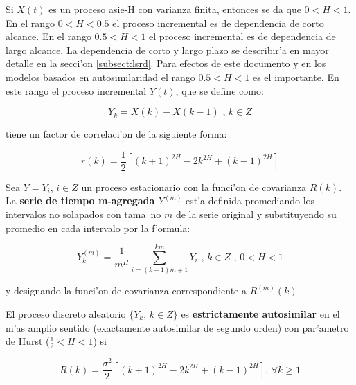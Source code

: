 Si $X(t)$ es un proceso asie-H con varianza finita, entonces se da que
$0 < H < 1$.  En el rango $0 < H < 0.5$ el proceso incremental es de 
dependencia de corto alcance. En el rango $0.5 < H < 1$ el proceso incremental 
es de dependencia de largo alcance.  La dependencia de corto y largo plazo se
describir'a en mayor detalle en la secci'on \ref{subsect:lsrd}. Para efectos de
este documento y en los modelos basados en autosimilaridad el rango
$0.5 < H < 1$ es el importante. En este rango el proceso incremental $Y(t)$, que
se define como:

\begin{equation} \label{eq:correlation2}
Y_k = X(k) - X(k -1) \text{ ,  } k \in Z
\end{equation}

tiene un factor de correlaci'on de la siguiente forma:

\begin{equation} \label{eq:correlation3}
r(k) = \frac{1}{2}[(k+1)^{2H} - 2k^{2H} + (k - 1)^{2H}]
\end{equation}

\begin{definicion} \label{def:agregado}
Sea $Y = { Y_i \text{, } i \in Z}$ un proceso estacionario con la funci'on de
covarianza $R(k)$. La {\bf serie de tiempo m-agregada $Y^{(m)}$ } est'a
definida promediando los intervalos no solapados con tama~no $m$ de la serie
original y substituyendo su promedio en cada intervalo por la f'ormula:

\begin{equation}
Y_k^{(m)} = \frac{1}{m^{H}} \sum_{i = (k - 1)m + 1}^{km}{Y_i} \text{ ,  } k \in Z \text{ ,  } 0 < H < 1
\end{equation}

y designando la funci'on de covarianza correspondiente a $R^{(m)}(k)$.
\end{definicion}

\begin{definicion} \label{def:so-autosimilar}
El proceso discreto aleatorio $\{Y_k \text{,  } k \in Z\}$ es {\bf
estrictamente autosimilar} en el m'as amplio sentido (exactamente autosimilar
de segundo orden) con par'ametro de Hurst ($\frac{1}{2} < H < 1$) si

\begin{equation} \label{eq:so-autosimilar}
R(k) = \frac{\sigma^2}{2}[(k+1)^{2H} - 2k^{2H} + (k - 1)^{2H}] \text{,  } \forall k \geq 1 
\end{equation}
\end{definicion}

